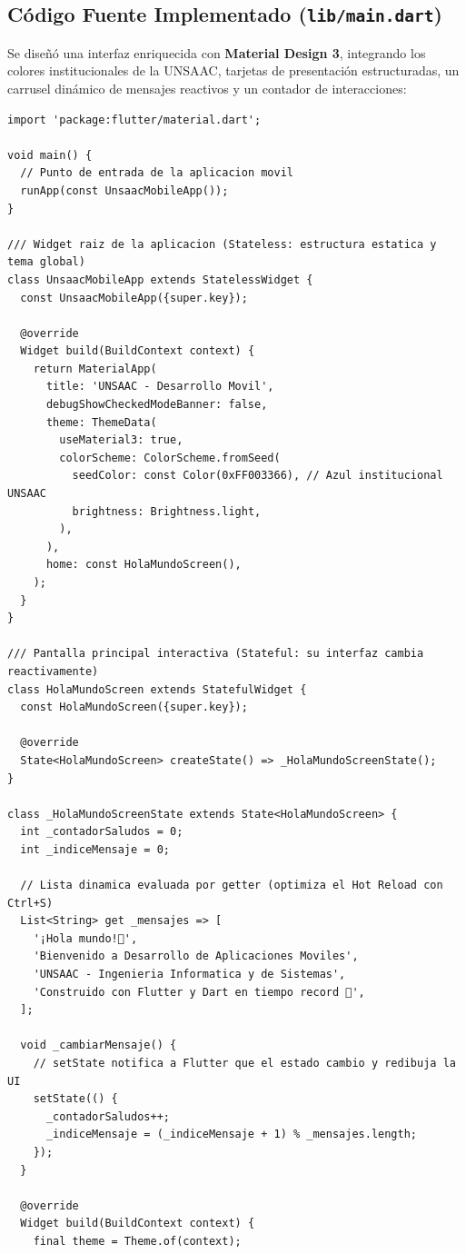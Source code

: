\documentclass[12pt,a4paper]{article}
\begin{document}
\subsection{Código Fuente Implementado (\texttt{lib/main.dart})}
Se diseñó una interfaz enriquecida con \textbf{Material Design 3}, integrando los colores institucionales de la UNSAAC, tarjetas de presentación estructuradas, un carrusel dinámico de mensajes reactivos y un contador de interacciones:

\begin{lstlisting}
import 'package:flutter/material.dart';

void main() {
  // Punto de entrada de la aplicacion movil
  runApp(const UnsaacMobileApp());
}

/// Widget raiz de la aplicacion (Stateless: estructura estatica y tema global)
class UnsaacMobileApp extends StatelessWidget {
  const UnsaacMobileApp({super.key});

  @override
  Widget build(BuildContext context) {
    return MaterialApp(
      title: 'UNSAAC - Desarrollo Movil',
      debugShowCheckedModeBanner: false,
      theme: ThemeData(
        useMaterial3: true,
        colorScheme: ColorScheme.fromSeed(
          seedColor: const Color(0xFF003366), // Azul institucional UNSAAC
          brightness: Brightness.light,
        ),
      ),
      home: const HolaMundoScreen(),
    );
  }
}

/// Pantalla principal interactiva (Stateful: su interfaz cambia reactivamente)
class HolaMundoScreen extends StatefulWidget {
  const HolaMundoScreen({super.key});

  @override
  State<HolaMundoScreen> createState() => _HolaMundoScreenState();
}

class _HolaMundoScreenState extends State<HolaMundoScreen> {
  int _contadorSaludos = 0;
  int _indiceMensaje = 0;

  // Lista dinamica evaluada por getter (optimiza el Hot Reload con Ctrl+S)
  List<String> get _mensajes => [
    '¡Hola mundo!📱',
    'Bienvenido a Desarrollo de Aplicaciones Moviles',
    'UNSAAC - Ingenieria Informatica y de Sistemas',
    'Construido con Flutter y Dart en tiempo record 🚀',
  ];

  void _cambiarMensaje() {
    // setState notifica a Flutter que el estado cambio y redibuja la UI
    setState(() {
      _contadorSaludos++;
      _indiceMensaje = (_indiceMensaje + 1) % _mensajes.length;
    });
  }

  @override
  Widget build(BuildContext context) {
    final theme = Theme.of(context);


\end{lstlisting}
\end{document}
